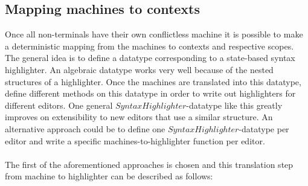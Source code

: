 	
	\pagebreak
	
	\pagebreak
	
	\subsection{Mapping machines to contexts}
	Once all non-terminals have their own conflictless machine it is possible to make a deterministic mapping from the machines to contexts and respective scopes. The general idea is to define a datatype corresponding to a state-based syntax highlighter. An algebraic datatype works very well because of the nested structures of a highlighter. Once the machines are translated into this datatype, define different methods on this datatype in order to write out highlighters for different editors. One general $SyntaxHighlighter$-datatype like this greatly improves on extensibility to new editors that use a similar structure. An alternative approach could be to define one $SyntaxHighlighter$-datatype per editor and write a specific machines-to-highlighter function per editor.\\\\
	The first of the aforementioned approaches is chosen and this translation step from machine to highlighter can be described as follows:
